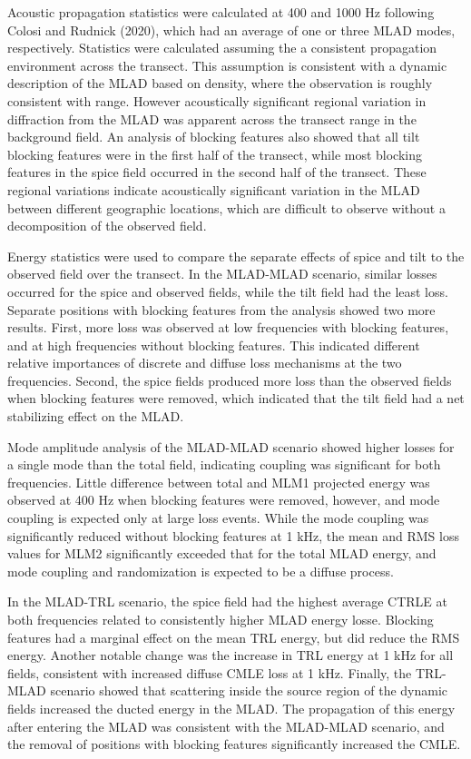 \documentclass[preprint,NumberedRefs]{JASA}
\begin{document}
Acoustic propagation statistics were calculated at 400 and 1000 Hz following Colosi and Rudnick (2020),\cite{colosi2020observations} which had an average of one or three MLAD modes, respectively. Statistics were calculated assuming the a consistent propagation environment across the transect. This assumption is consistent with a dynamic description of the MLAD based on density,\citep{cole2010seasonal} where the observation is roughly consistent with range. However acoustically significant regional variation in diffraction from the MLAD was apparent across the transect range in the background field. An analysis of blocking features also showed that all tilt blocking features were in the first half of the transect, while most blocking features in the spice field occurred in the second half of the transect. These regional variations indicate acoustically significant variation in the MLAD between different geographic locations, which are difficult to observe without a decomposition of the observed field.

Energy statistics were used to compare the separate effects of spice and tilt to the observed field over the transect. In the MLAD-MLAD scenario, similar losses occurred for the spice and observed fields, while the tilt field had the least loss. Separate positions with blocking features from the analysis showed two more results. First, more loss was observed at low frequencies with blocking features, and at high frequencies without blocking features. This indicated different relative importances of discrete and diffuse loss mechanisms at the two frequencies. Second, the spice fields produced more loss than the observed fields when blocking features were removed, which indicated that the tilt field had a net stabilizing effect on the MLAD.

Mode amplitude analysis of the MLAD-MLAD scenario showed higher losses for a single mode than the total field, indicating coupling was significant for both frequencies. Little difference between total and MLM1 projected energy was observed at 400 Hz when blocking features were removed, however, and mode coupling is expected only at large loss events. While the mode coupling was significantly reduced without blocking features at 1 kHz, the mean and RMS loss values for MLM2 significantly exceeded that for the total MLAD energy, and mode coupling and randomization is expected to be a diffuse process.

In the MLAD-TRL scenario, the spice field had the highest average CTRLE at both frequencies related to consistently higher MLAD energy losse. Blocking features had a marginal effect on the mean TRL energy, but did reduce the RMS energy. Another notable change was the increase in TRL energy at 1 kHz for all fields, consistent with increased diffuse CMLE loss at 1 kHz. Finally, the TRL-MLAD scenario showed that scattering inside the source region of the dynamic fields increased the ducted energy in the MLAD. The propagation of this energy after entering the MLAD was consistent with the MLAD-MLAD scenario, and the removal of positions with blocking features significantly increased the CMLE.
\end{document}
